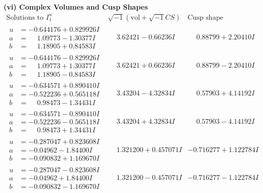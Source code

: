 \documentclass[1p]{elsarticle_modified}
\theoremstyle{definition}
\newcommand{\I}{\sqrt{-1}}
\begin{document}
\newpage\flushleft \textbf{(vi) Complex Volumes and Cusp Shapes}
$$\begin{array}{c|c|c}  
\text{Solutions to }I^u_{1}& \I (\text{vol} + \sqrt{-1}CS) & \text{Cusp shape}\\
 \hline 
\begin{aligned}
u &= -0.644176 + 0.829926 I \\
a &= \phantom{-}1.09773 - 1.30377 I \\
b &= \phantom{-}1.18905 + 0.84583 I\end{aligned}
 & \phantom{-}3.62421 - 0.66236 I & \phantom{-}0.88799 + 2.20410 I \\ \hline\begin{aligned}
u &= -0.644176 - 0.829926 I \\
a &= \phantom{-}1.09773 + 1.30377 I \\
b &= \phantom{-}1.18905 - 0.84583 I\end{aligned}
 & \phantom{-}3.62421 + 0.66236 I & \phantom{-}0.88799 - 2.20410 I \\ \hline\begin{aligned}
u &= -0.634571 + 0.890410 I \\
a &= -0.522236 + 0.565118 I \\
b &= \phantom{-}0.98473 - 1.34431 I\end{aligned}
 & \phantom{-}3.43204 - 4.32834 I & \phantom{-}0.57903 + 4.14192 I \\ \hline\begin{aligned}
u &= -0.634571 - 0.890410 I \\
a &= -0.522236 - 0.565118 I \\
b &= \phantom{-}0.98473 + 1.34431 I\end{aligned}
 & \phantom{-}3.43204 + 4.32834 I & \phantom{-}0.57903 - 4.14192 I \\ \hline\begin{aligned}
u &= -0.287047 + 0.823608 I \\
a &= -0.04962 - 1.84400 I \\
b &= -0.090832 + 1.169670 I\end{aligned}
 & \phantom{-}1.321200 + 0.457071 I & -0.716277 + 1.122784 I \\ \hline\begin{aligned}
u &= -0.287047 - 0.823608 I \\
a &= -0.04962 + 1.84400 I \\
b &= -0.090832 - 1.169670 I\end{aligned}
 & \phantom{-}1.321200 - 0.457071 I & -0.716277 - 1.122784 I \\ \hline\begin{aligned}

\end{aligned}
\end{array}$$
\end{document}
